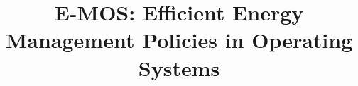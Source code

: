 \title{
\vspace{-0.15in}
E-MOS: Efficient Energy Management Policies in Operating Systems
\vspace{-0.15in}
}

